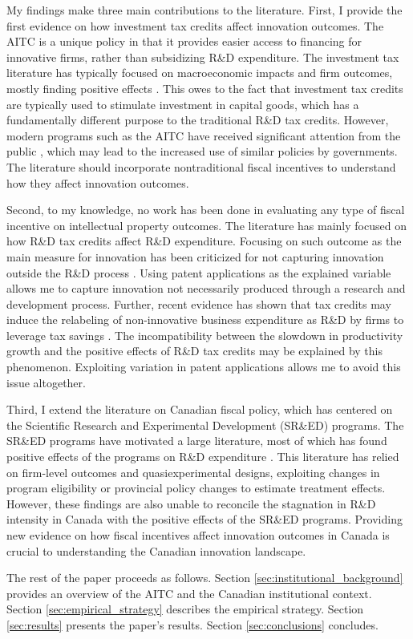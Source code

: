 \documentclass[../main.tex]{subfiles}
\begin{document}
My findings make three main contributions to the literature. First, I provide the first evidence on how investment tax credits affect innovation outcomes. The AITC is a unique policy in that it provides easier access to financing for innovative firms, rather than subsidizing R\&D expenditure. The investment tax literature has typically focused on macroeconomic impacts and firm outcomes, mostly finding positive effects \parencite{pereira94, lyon89, slattery_zidar20}. This owes to the fact that investment tax credits are typically used to stimulate investment in capital goods, which has a fundamentally different purpose to the traditional R\&D tax credits. However, modern programs such as the AITC have received significant attention from the public \parencite{albertachamberofcommerce23,zabjeck16}, which may lead to the increased use of similar policies by governments. The literature should incorporate nontraditional fiscal incentives to understand how they affect innovation outcomes.

Second, to my knowledge, no work has been done in evaluating any type of fiscal incentive on intellectual property outcomes. The literature has mainly focused on how R\&D tax credits affect R\&D expenditure. Focusing on such outcome as the main measure for innovation has been criticized for not capturing innovation outside the R\&D process \parencite{xie_etal19}. Using patent applications as the explained variable allows me to capture innovation not necessarily produced through a research and development process. Further, recent evidence has shown that tax credits may induce the relabeling of non-innovative business expenditure as R\&D by firms to leverage tax savings \parencite{chen_etal21}. The incompatibility between the slowdown in productivity growth and the positive effects of R\&D tax credits may be explained by this phenomenon. Exploiting variation in patent applications allows me to avoid this issue altogether.

Third, I extend the literature on Canadian fiscal policy, which has centered on the Scientific Research and Experimental Development (SR\&ED) programs. The SR\&ED programs have motivated a large literature, most of which has found positive effects of the programs on R\&D expenditure \parencite{agrawal_etal20,czarnitzki_etal11,berube_mohnen09,mansfield_switzer85a,bernstein86b}. This literature has relied on firm-level outcomes and quasiexperimental designs, exploiting changes in program eligibility or provincial policy changes to estimate treatment effects. However, these findings are also unable to reconcile the stagnation in R\&D intensity in Canada with the positive effects of the SR\&ED programs. Providing new evidence on how fiscal incentives affect innovation outcomes in Canada is crucial to understanding the Canadian innovation landscape. 

The rest of the paper proceeds as follows. Section \ref{sec:institutional_background} provides an overview of the AITC and the Canadian institutional context. Section \ref{sec:empirical_strategy} describes the empirical strategy. Section \ref{sec:results} presents the paper's results. Section \ref{sec:conclusions} concludes.
\end{document}
